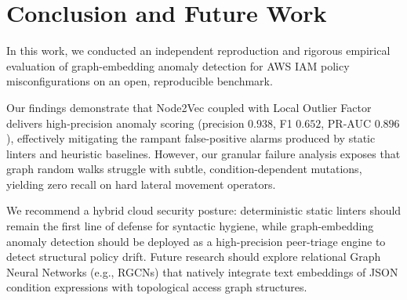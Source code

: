 \section{Conclusion and Future Work}
\label{sec:conclusion}

In this work, we conducted an independent reproduction and rigorous empirical evaluation of graph-embedding anomaly detection for AWS IAM policy misconfigurations on an open, reproducible benchmark. 

Our findings demonstrate that Node2Vec coupled with Local Outlier Factor delivers high-precision anomaly scoring (precision $0.938$, F1 $0.652$, PR-AUC $0.896$), effectively mitigating the rampant false-positive alarms produced by static linters and heuristic baselines. However, our granular failure analysis exposes that graph random walks struggle with subtle, condition-dependent mutations, yielding zero recall on hard lateral movement operators. 

We recommend a hybrid cloud security posture: deterministic static linters should remain the first line of defense for syntactic hygiene, while graph-embedding anomaly detection should be deployed as a high-precision peer-triage engine to detect structural policy drift. Future research should explore relational Graph Neural Networks (e.g., RGCNs) that natively integrate text embeddings of JSON condition expressions with topological access graph structures.

